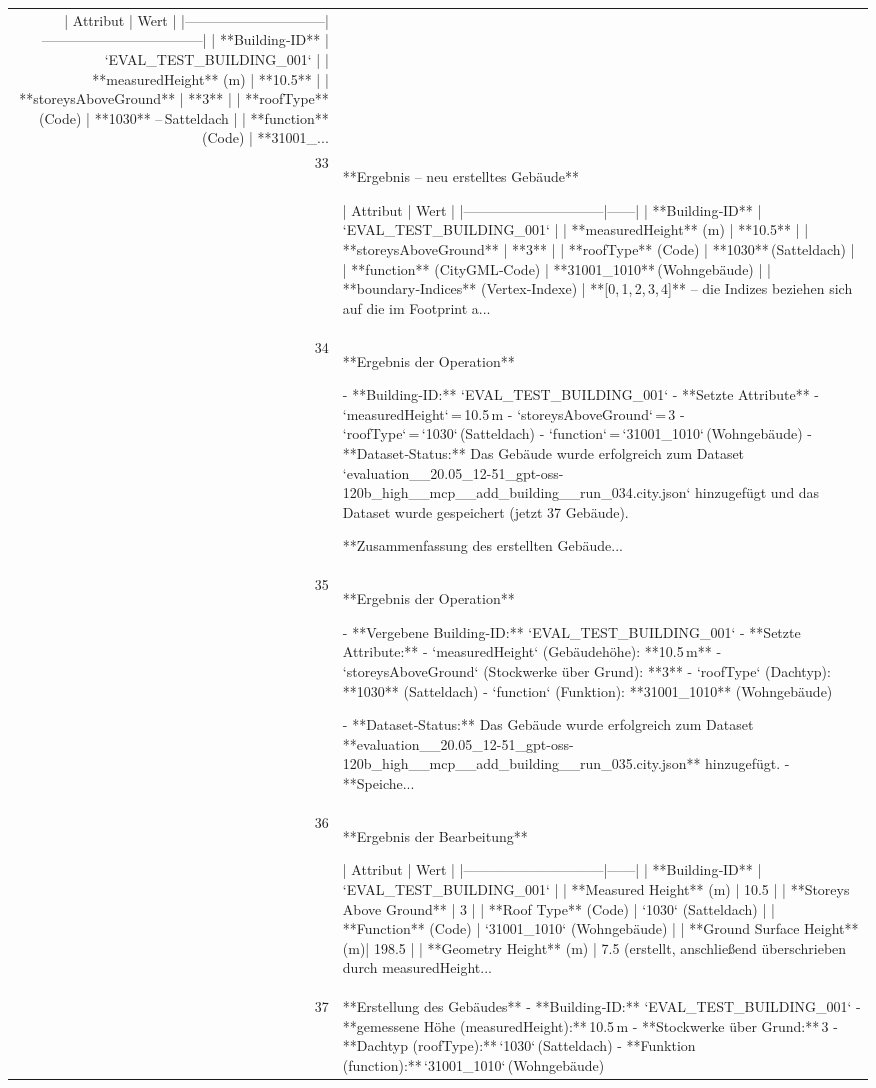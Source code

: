 \documentclass[a4paper,11pt]{article}
\begin{document}
\begin{table}[ht]
\begin{tabular}{r p{12cm}}
| Attribut                     | Wert                              |
|------------------------------|-----------------------------------|
| **Building‑ID**              | `EVAL\_TEST\_BUILDING\_001`          |
| **measuredHeight** (m)       | **10.5**                          |
| **storeysAboveGround**       | **3**                             |
| **roofType** (Code)          | **1030**  – Satteldach            |
| **function** (Code)          | **31001\_... \\
33 & **Ergebnis – neu erstelltes Gebäude**

| Attribut                     | Wert |
|------------------------------|------|
| **Building‑ID**               | `EVAL\_TEST\_BUILDING\_001` |
| **measuredHeight** (m)        | **10.5** |
| **storeysAboveGround**        | **3** |
| **roofType** (Code)           | **1030** (Satteldach) |
| **function** (CityGML‑Code)  | **31001\_1010** (Wohngebäude) |
| **boundary‑Indices** (Vertex‑Indexe) | **[0, 1, 2, 3, 4]** – die Indizes beziehen sich auf die im Footprint a... \\
34 & **Ergebnis der Operation**

- **Building‑ID:** `EVAL\_TEST\_BUILDING\_001`  
- **Setzte Attribute**  
  - `measuredHeight` = 10.5 m  
  - `storeysAboveGround` = 3  
  - `roofType` = `1030` (Satteldach)  
  - `function` = `31001\_1010` (Wohngebäude)  
- **Dataset‑Status:** Das Gebäude wurde erfolgreich zum Dataset `evaluation\_\_20.05\_12-51\_gpt-oss-120b\_high\_\_mcp\_\_add\_building\_\_run\_034.city.json` hinzugefügt und das Dataset wurde gespeichert (jetzt 37 Gebäude).

**Zusammenfassung des erstellten Gebäude... \\
35 & **Ergebnis der Operation**

- **Vergebene Building-ID:** `EVAL\_TEST\_BUILDING\_001`  
- **Setzte Attribute:**  
  - `measuredHeight` (Gebäudehöhe): **10.5 m**  
  - `storeysAboveGround` (Stockwerke über Grund): **3**  
  - `roofType` (Dachtyp): **1030** (Satteldach)  
  - `function` (Funktion): **31001\_1010** (Wohngebäude)  

- **Dataset‑Status:** Das Gebäude wurde erfolgreich zum Dataset **evaluation\_\_20.05\_12-51\_gpt-oss-120b\_high\_\_mcp\_\_add\_building\_\_run\_035.city.json** hinzugefügt.  
- **Speiche... \\
36 & **Ergebnis der Bearbeitung**

| Attribut                     | Wert |
|------------------------------|------|
| **Building‑ID**              | `EVAL\_TEST\_BUILDING\_001` |
| **Measured Height** (m)      | 10.5 |
| **Storeys Above Ground**     | 3 |
| **Roof Type** (Code)         | `1030` (Satteldach) |
| **Function** (Code)          | `31001\_1010` (Wohngebäude) |
| **Ground Surface Height** (m)| 198.5 |
| **Geometry Height** (m)      | 7.5 (erstellt, anschließend überschrieben durch measuredHeight... \\
37 & **Erstellung des Gebäudes**  
- **Building‑ID:** `EVAL\_TEST\_BUILDING\_001`  
- **gemessene Höhe (measuredHeight):** 10.5 m  
- **Stockwerke über Grund:** 3  
- **Dachtyp (roofType):** `1030` (Satteldach)  
- **Funktion (function):** `31001\_1010` (Wohngebäude)  


\end{tabular}
\end{table}
\end{document}
